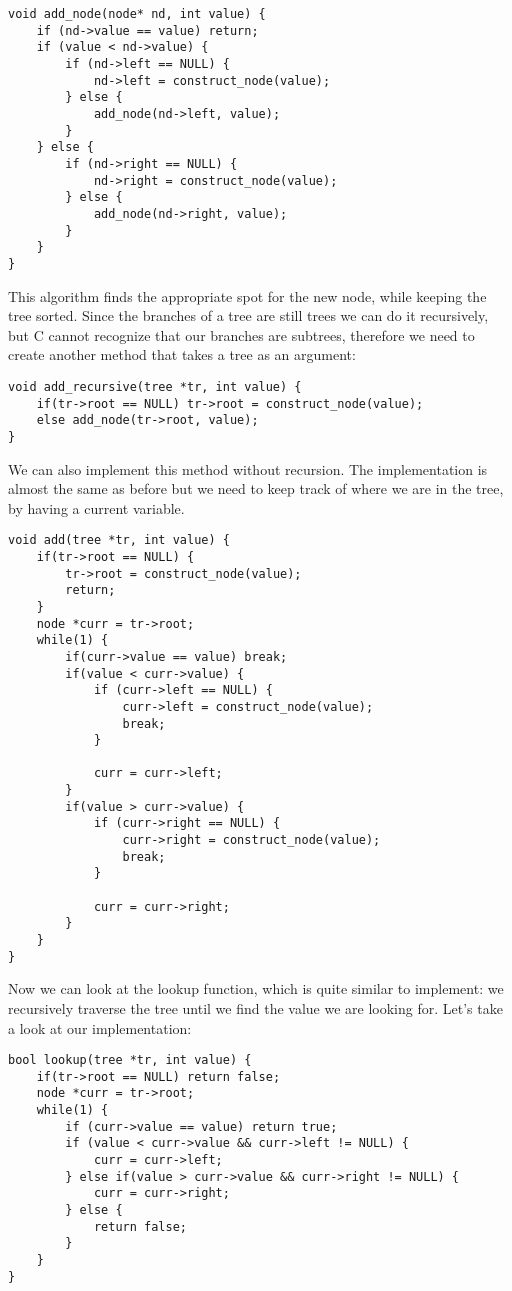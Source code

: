 \documentclass[a4paper,11pt]{article}
\begin{document}
     \begin{verbatim}
void add_node(node* nd, int value) {
    if (nd->value == value) return;
    if (value < nd->value) {
        if (nd->left == NULL) {
            nd->left = construct_node(value);
        } else {
            add_node(nd->left, value);
        }
    } else {
        if (nd->right == NULL) {
            nd->right = construct_node(value);
        } else {
            add_node(nd->right, value);
        }
    }
}
     \end{verbatim}

     This algorithm finds the appropriate spot for the new node, while keeping the tree sorted.
     Since the branches of a tree are still trees we can do it recursively, but C cannot recognize that our branches are subtrees, therefore we need to create another method that takes a tree as an argument:

     \begin{verbatim}
void add_recursive(tree *tr, int value) {
    if(tr->root == NULL) tr->root = construct_node(value);
    else add_node(tr->root, value);
}
     \end{verbatim}

    We can also implement this method without recursion.
    The implementation is almost the same as before but we need to keep track of where we are in the tree, by having a current variable.
    \begin{verbatim}
void add(tree *tr, int value) {
    if(tr->root == NULL) {
        tr->root = construct_node(value);
        return;
    }
    node *curr = tr->root;
    while(1) {
        if(curr->value == value) break;
        if(value < curr->value) {
            if (curr->left == NULL) {
                curr->left = construct_node(value);
                break;
            }

            curr = curr->left;
        }
        if(value > curr->value) {
            if (curr->right == NULL) {
                curr->right = construct_node(value);
                break;
            }

            curr = curr->right;
        }
    }
}
    \end{verbatim}


     Now we can look at the lookup function, which is quite similar to implement: we recursively traverse the tree until we find the value we are looking for.
     Let's take a look at our implementation:
     \begin{verbatim}
bool lookup(tree *tr, int value) {
    if(tr->root == NULL) return false;
    node *curr = tr->root;
    while(1) {
        if (curr->value == value) return true;
        if (value < curr->value && curr->left != NULL) {
            curr = curr->left;
        } else if(value > curr->value && curr->right != NULL) {
            curr = curr->right;
        } else {
            return false;
        }
    }
}
    \end{verbatim}
\end{document}
